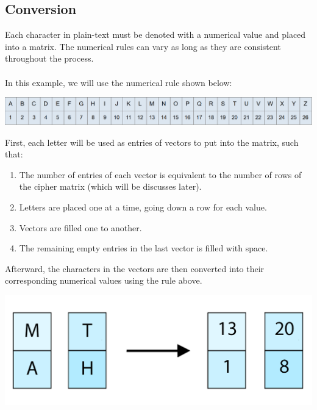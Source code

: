 \documentclass[11pt]{article}
\begin{document}
\begin{subs}
\subsection{Conversion}
\phantom{x}\hspace{3mm}Each character in plain-text must be denoted with a numerical value and placed into a matrix. The numerical rules can vary as long as they are consistent throughout the process.\\\\
\phantom{x}\hspace{1mm}In this example, we will use the numerical rule shown below:\vspace{3mm}
\begin{center}\includegraphics[scale=0.275]{numerical}\vspace{5mm}\end{center}

First, each letter will be used as entries of vectors to put into the matrix, such that:
	\begin{enumerate}
	\itemsep-1em 
	\item The number of entries of each vector is equivalent to the number of rows of the cipher matrix (which will be discusses later).\\
	\item Letters are placed one at a time, going down a row for each value.\\
	\item Vectors are filled one to another.\\
	\item The remaining empty entries in the last vector is filled with space.\vspace{3mm}
	\end{enumerate}
Afterward, the characters in the vectors are then converted into their corresponding numerical values using the rule above.
\begin{center} \includegraphics[scale=0.2]{math_1} \end{center}


\end{subs}
\end{document}
